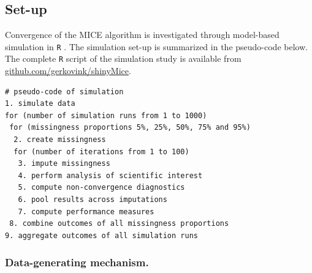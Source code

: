 \documentclass[Royal,times,sageh]{sagej}
\begin{document}
\hypertarget{set-up}{%
\subsection{Set-up}\label{set-up}}

Convergence of the MICE algorithm is investigated through model-based
simulation in \texttt{R} \citep[version 3.6.3;][]{R}. The simulation
set-up is summarized in the pseudo-code below. The complete \texttt{R}
script of the simulation study is available from
\href{https://github.com/gerkovink/shinyMice/tree/master/3.Thesis/1.SimulationStudy}{github.com/gerkovink/shinyMice}.

\begin{verbatim}
# pseudo-code of simulation 
1. simulate data 
for (number of simulation runs from 1 to 1000)
 for (missingness proportions 5%, 25%, 50%, 75% and 95%)
  2. create missingness
  for (number of iterations from 1 to 100)
   3. impute missingness
   4. perform analysis of scientific interest
   5. compute non-convergence diagnostics 
   6. pool results across imputations
   7. compute performance measures
 8. combine outcomes of all missingness proportions
9. aggregate outcomes of all simulation runs 
\end{verbatim}

\hypertarget{data-generating-mechanism.}{%
\subsubsection{Data-generating
mechanism.}\label{data-generating-mechanism.}}
\end{document}
